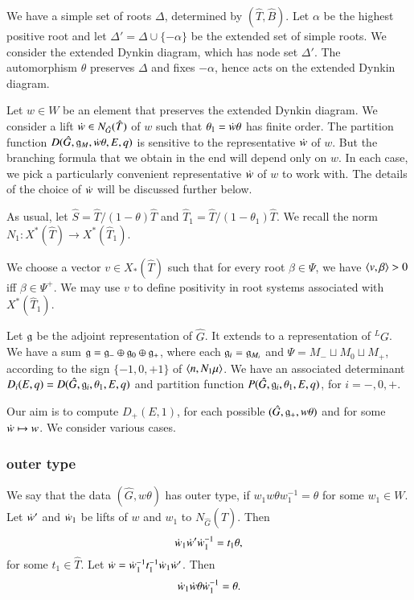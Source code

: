 We have a simple set of roots $\Delta$, determined by $(\hat T,\hat B)$.  Let $\alpha$ be the highest
positive root and let $\Delta' = \Delta \cup \{-\alpha\}$ be the extended set of simple roots.   We 
consider the extended Dynkin diagram, which has node set $\Delta'$.  The automorphism $\theta$ preserves
$\Delta$ and fixes $-\alpha$, hence acts on the extended Dynkin diagram.

Let $w\in W$ be an element that preserves the extended Dynkin diagram.  We consider a lift $\dot w\in N_{\hat G}(\hat T)$ of $w$
such that $\theta_1 = \dot w \theta$ has finite order.  
The partition function $D(\hat G,{\mathfrak g}_M,\dot w\theta,E,q)$ is sensitive to the representative $\dot w$ of $w$.  But the branching
formula that we obtain in the end will depend only on $w$.  In each case, we pick a particularly convenient representative $\dot w$ 
of $w$ to work with.
The details of the choice of $\dot w$ will be discussed further below.

As usual, 
let $\hat S = \hat T/(1-\theta)\hat T$ and $\hat T_1 = \hat T/(1-\theta_1)\hat T$.
We recall the norm $N_1:X^*(\hat T)\to X^*(\hat T_1)$.

We choose a vector $v\in X_*(\hat T)$ such that for every root $\beta\in \Psi$, we have
$\langle{v,\beta}\rangle>0$ iff $\beta\in\Psi^+$.   We may use $v$ to define positivity in root systems associated with $X^*(\hat T_1)$.

Let ${\mathfrak g}$ be the adjoint representation of $\hat G$.  It extends to a representation of ${}^LG$.
We have a sum ${\mathfrak g} = {\mathfrak g}_-\oplus {\mathfrak g}_0 \oplus {\mathfrak g}_+$, where each ${\mathfrak g}_i = {\mathfrak g}_{M_i}$ and $\Psi = M_- \sqcup M_0 \sqcup M_+$, according to the
sign $\{-1,0,+1\}$ of $\langle{n,N_1\mu}\rangle$.
We have an associated determinant $D_i(E,q)=D(\hat G,{\mathfrak g}_i,\theta_1,E,q)$ and partition function $P(\hat G,{\mathfrak g}_i,\theta_1,E,q)$, for $i=-,0,+$.





Our aim is to compute $D_+(E,1)$, for each possible $(\hat G,{\mathfrak g}_+,w\theta)$ and for some $\dot w\mapsto w$.  
We consider various cases.

\subsubsection{outer type}

We say that the data $(\hat G,w\theta)$  has outer type, if $w_1 w \theta w_1^{-1}=\theta$ for some 
$w_1\in W$.
Let $\dot w'$ and $\dot w_1$ be lifts of $w$ and $w_1$ to $N_{\hat G}(\hat T)$.
Then
\[
\dot w_1 \dot w' \dot w_1^{-1} = t_1\theta,
\]
for some $t_1\in \hat T$.  Let $\dot w = \dot w_1^{-1} t_1^{-1} \dot w_1\dot w'$.
Then
\begin{equation}\label{eqn:outer}
\dot w_1\dot w \theta\dot w_1^{-1} = \theta.
\end{equation}


